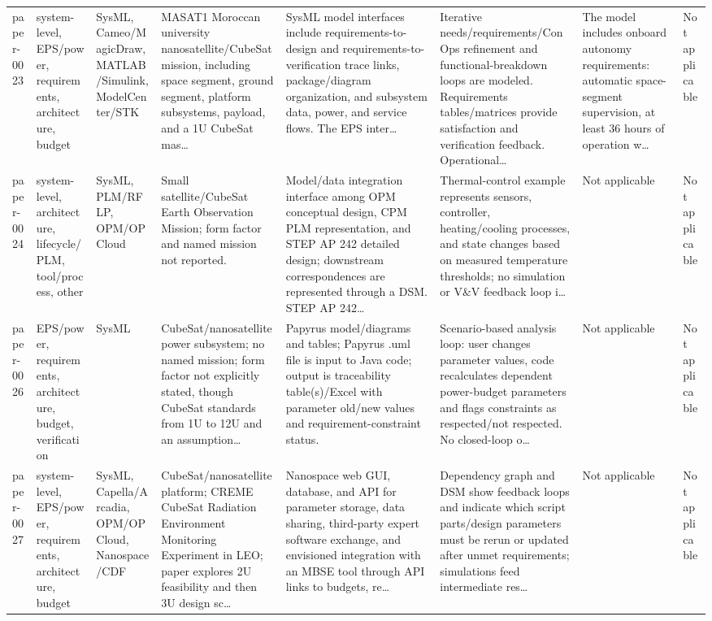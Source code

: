 \documentclass[10pt]{article}
\begin{document}
\begin{landscape}
\begin{longtable}{p{1.1cm}p{3.1cm}p{2.5cm}p{3.3cm}p{4.0cm}p{3.5cm}p{2.8cm}p{2.8cm}}
paper-0023 & system-level, EPS/power, requirements, architecture, budget & SysML, Cameo/MagicDraw, MATLAB/Simulink, ModelCenter/STK & MASAT1 Moroccan university nanosatellite/CubeSat mission, including space segment, ground segment, platform subsystems, payload, and a 1U CubeSat mas… & SysML model interfaces include requirements-to-design and requirements-to-verification trace links, package/diagram organization, and subsystem data, power, and service flows. The EPS inter… & Iterative needs/requirements/ConOps refinement and functional-breakdown loops are modeled. Requirements tables/matrices provide satisfaction and verification feedback. Operational… & The model includes onboard autonomy requirements: automatic space-segment supervision, at least 36 hours of operation w… & Not applicable \\
paper-0024 & system-level, architecture, lifecycle/PLM, tool/process, other & SysML, PLM/RFLP, OPM/OPCloud & Small satellite/CubeSat Earth Observation Mission; form factor and named mission not reported. & Model/data integration interface among OPM conceptual design, CPM PLM representation, and STEP AP 242 detailed design; downstream correspondences are represented through a DSM. STEP AP 242… & Thermal-control example represents sensors, controller, heating/cooling processes, and state changes based on measured temperature thresholds; no simulation or V\&V feedback loop i… & Not applicable & Not applicable \\
paper-0026 & EPS/power, requirements, architecture, budget, verification & SysML & CubeSat/nanosatellite power subsystem; no named mission; form factor not explicitly stated, though CubeSat standards from 1U to 12U and an assumption… & Papyrus model/diagrams and tables; Papyrus .uml file is input to Java code; output is traceability table(s)/Excel with parameter old/new values and requirement-constraint status. & Scenario-based analysis loop: user changes parameter values, code recalculates dependent power-budget parameters and flags constraints as respected/not respected. No closed-loop o… & Not applicable & Not applicable \\
paper-0027 & system-level, EPS/power, requirements, architecture, budget & SysML, Capella/Arcadia, OPM/OPCloud, Nanospace/CDF & CubeSat/nanosatellite platform; CREME CubeSat Radiation Environment Monitoring Experiment in LEO; paper explores 2U feasibility and then 3U design sc… & Nanospace web GUI, database, and API for parameter storage, data sharing, third-party expert software exchange, and envisioned integration with an MBSE tool through API links to budgets, re… & Dependency graph and DSM show feedback loops and indicate which script parts/design parameters must be rerun or updated after unmet requirements; simulations feed intermediate res… & Not applicable & Not applicable \\

\end{longtable}
\end{landscape}
\end{document}
